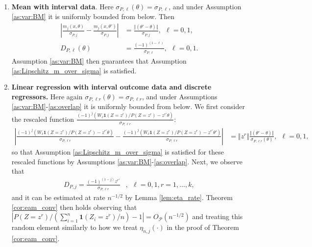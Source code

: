 \documentclass[letterpaper,11pt]{article}
\theoremstyle{myplain}
\theoremstyle{mydefinition}
\theoremstyle{myremark}
\newcommand{\cP}{\mathcal{P}}
\numberwithin{equation}{section}
\numberwithin{figure}{section}
\begin{document}
\begin{appendices}
\begin{enumerate}
\item \textbf{Mean with interval data}. Here $\sigma_{P,\ell}(\theta)=\sigma_{P,\ell}$, and under Assumption \ref{as:var:BM} it is uniformly bounded from below. Then
\begin{align*}
\left|\frac{m_j(x,\theta)}{\sigma_{P,j}}-\frac{m_j(x,\theta')}{\sigma_{P,j}}\right|&=\frac{\Vert(\theta'-\theta)\Vert}{\sigma_{P,j}},~~\ell=0,1,\\
D_{P,\ell}(\theta)&=\frac{(-1)^{(1-\ell)}}{\sigma_{P,\ell}},~~\ell=0,1.
\end{align*} 
Assumption \ref{as:var:BM} then guarantees that Assumption \ref{as:Lipschitz_m_over_sigma} is satisfied.
\item \textbf{Linear regression with interval outcome data and discrete regressors.}  Here again $\sigma_{P,\ell r}(\theta)=\sigma_{P,\ell r}$, and under Assumptions \ref{as:var:BM}-\ref{as:overlap} it is uniformly bounded from below. We first consider the rescaled function $\frac{(-1)^j(W_\ell\mathbf{1}(Z=z^r)/P(Z=z^r)-z^{r\prime}\theta)}{\sigma_{P,\ell r}}$:
\begin{align*}
\left|\frac{(-1)^j(W_\ell\mathbf{1}(Z=z^r)/P(Z=z^r)-z^{r\prime}\theta)}{\sigma_{P,\ell r}}-\frac{(-1)^j(W_\ell\mathbf{1}(Z=z^r)/P(Z=z^r)-z^{r\prime}\theta')}{\sigma_{P,\ell r}}\right|&=\Vert z^r \Vert\frac{\Vert(\theta'-\theta)\Vert}{\sigma_{P,\ell r}(\theta)},~~\ell=0,1,
\end{align*} 
so that Assumption \ref{as:Lipschitz_m_over_sigma} is satisfied for these rescaled functions by  Assumptions \ref{as:var:BM}-\ref{as:overlap}. Next, we observe that
\begin{align*}
D_{P,j}=\frac{(-1)^{(1-j)}z^{r\prime}}{\sigma_{P,\ell r}}&,~~\ell=0,1,r=1,\dots,k,
\end{align*} 
and it can be estimated at rate $n^{-1/2}$ by Lemma \ref{lem:eta_rate}. Theorem \ref{cor:eam_conv} then holds observing that $|P(Z=z^r)/(\sum_{i=1}^n \mathbf{1}(Z_i=z^r)/n)-1| = O_{\cP}(n^{-1/2})$ and treating this random element similarly to how we treat $\eta_{n,j}(\cdot)$ in the proof of Theorem \ref{cor:eam_conv}.
 

\end{enumerate}
\end{appendices}
\end{document}
